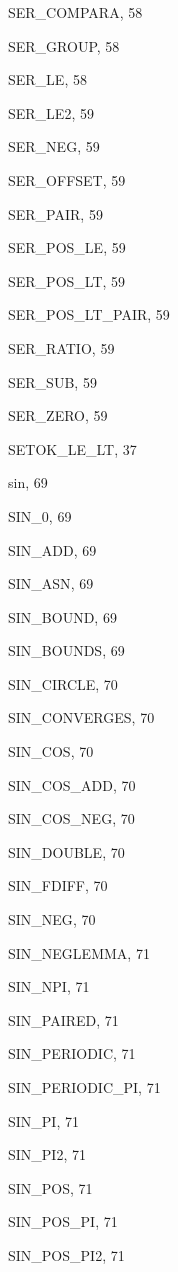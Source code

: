 \begin{theindex}
  \item {\ptt SER\_COMPARA}, 58
  \item {\ptt SER\_GROUP}, 58
  \item {\ptt SER\_LE}, 58
  \item {\ptt SER\_LE2}, 59
  \item {\ptt SER\_NEG}, 59
  \item {\ptt SER\_OFFSET}, 59
  \item {\ptt SER\_PAIR}, 59
  \item {\ptt SER\_POS\_LE}, 59
  \item {\ptt SER\_POS\_LT}, 59
  \item {\ptt SER\_POS\_LT\_PAIR}, 59
  \item {\ptt SER\_RATIO}, 59
  \item {\ptt SER\_SUB}, 59
  \item {\ptt SER\_ZERO}, 59
  \item {\ptt SETOK\_LE\_LT}, 37
  \item {\ptt sin}, 69
  \item {\ptt SIN\_0}, 69
  \item {\ptt SIN\_ADD}, 69
  \item {\ptt SIN\_ASN}, 69
  \item {\ptt SIN\_BOUND}, 69
  \item {\ptt SIN\_BOUNDS}, 69
  \item {\ptt SIN\_CIRCLE}, 70
  \item {\ptt SIN\_CONVERGES}, 70
  \item {\ptt SIN\_COS}, 70
  \item {\ptt SIN\_COS\_ADD}, 70
  \item {\ptt SIN\_COS\_NEG}, 70
  \item {\ptt SIN\_DOUBLE}, 70
  \item {\ptt SIN\_FDIFF}, 70
  \item {\ptt SIN\_NEG}, 70
  \item {\ptt SIN\_NEGLEMMA}, 71
  \item {\ptt SIN\_NPI}, 71
  \item {\ptt SIN\_PAIRED}, 71
  \item {\ptt SIN\_PERIODIC}, 71
  \item {\ptt SIN\_PERIODIC\_PI}, 71
  \item {\ptt SIN\_PI}, 71
  \item {\ptt SIN\_PI2}, 71
  \item {\ptt SIN\_POS}, 71
  \item {\ptt SIN\_POS\_PI}, 71
  \item {\ptt SIN\_POS\_PI2}, 71

\end{theindex}
